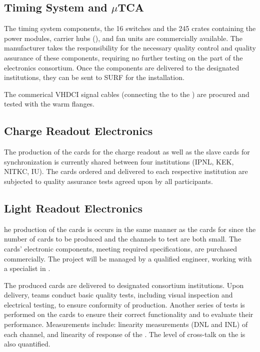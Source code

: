 \subsection{Timing System and $\mu$TCA}
\label{ssec:dp-tpcelec-prod-utca}

The timing system components, the  \num{16}  switches and the \num{245}  crates containing the power modules, carrier hubs (), and fan units are commercially available. The manufacturer takes the responsibility for the necessary quality control and quality assurance of these components, requiring no further testing on the part of the \dual electronics consortium. Once the components are delivered to the designated institutions, they can be sent to SURF for the installation. 

The commerical VHDCI signal cables (connecting the  to the ) are procured and tested with the  warm flanges.

\subsection{Charge Readout Electronics}
\label{ssec:dp-tpcelec-prod-cro}

The production of the  cards for the charge readout as well as the  slave cards for synchronization is currently shared between four institutions (IPNL, KEK, NITKC, IU). The cards ordered and delivered to each respective institution are subjected to quality assurance tests agreed upon by all participants. 

\subsection{Light Readout Electronics}
\label{ssec:dp-tpcelec-prod-lro}

he production of the   cards is occurs in the same manner as the cards for  since the number of cards to be produced and the channels to test are both small. The cards' electronic components, meeting required specifications, are purchased commercially. The project will be managed by a qualified engineer, working with a specialist in .

The produced cards are delivered to designated consortium institutions. Upon delivery, teams conduct basic quality tests, including visual inspection and electrical testing, to ensure conformity of production. Another series of tests is performed on the cards to ensure their correct functionality and to evaluate their performance. Measurements include: linearity measurements (DNL and INL) of each  channel, and linearity of response of the . The level of cross-talk on the  is also quantified.

